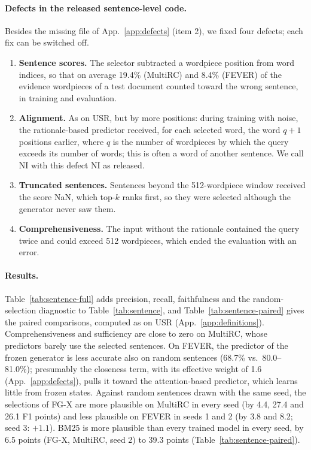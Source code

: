 \documentclass[11pt]{article}
\begin{document}
\paragraph{Defects in the released sentence-level code.} Besides the missing file of App.~\ref{app:defects} (item 2), we fixed four defects; each fix can be switched off.
\begin{enumerate}
  \setlength\itemsep{1pt}
  \item \textbf{Sentence scores.} The selector subtracted a wordpiece position from word indices, so that on average 19.4\% (MultiRC) and 8.4\% (FEVER) of the evidence wordpieces of a test document counted toward the wrong sentence, in training and evaluation.
  \item \textbf{Alignment.} As on USR, but by more positions: during training with noise, the rationale-based predictor received, for each selected word, the word $q + 1$ positions earlier, where $q$ is the number of wordpieces by which the query exceeds its number of words; this is often a word of another sentence. We call NI with this defect NI as released.
  \item \textbf{Truncated sentences.} Sentences beyond the 512-wordpiece window received the score NaN, which top-$k$ ranks first, so they were selected although the generator never saw them.
  \item \textbf{Comprehensiveness.} The input without the rationale contained the query twice and could exceed 512 wordpieces, which ended the evaluation with an error.
\end{enumerate}

\paragraph{Results.} Table~\ref{tab:sentence-full} adds precision, recall, faithfulness and the random-selection diagnostic to Table~\ref{tab:sentence}, and Table~\ref{tab:sentence-paired} gives the paired comparisons, computed as on USR (App.~\ref{app:definitions}). Comprehensiveness and sufficiency are close to zero on MultiRC, whose predictors barely use the selected sentences. On FEVER, the predictor of the frozen generator is less accurate also on random sentences (68.7\% vs.\ 80.0--81.0\%); presumably the closeness term, with its effective weight of 1.6 (App.~\ref{app:defects}), pulls it toward the attention-based predictor, which learns little from frozen states. Against random sentences drawn with the same seed, the selections of FG-X are more plausible on MultiRC in every seed (by 4.4, 27.4 and 26.1 F1 points) and less plausible on FEVER in seeds 1 and 2 (by 3.8 and 8.2; seed 3: $+1.1$). BM25 is more plausible than every trained model in every seed, by 6.5 points (FG-X, MultiRC, seed 2) to 39.3 points (Table~\ref{tab:sentence-paired}).
\end{document}
